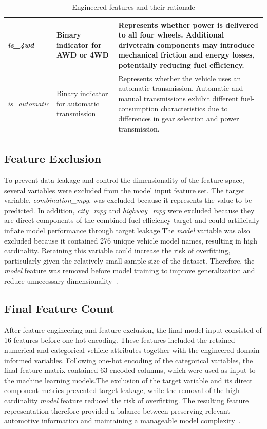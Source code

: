 \begin{table}[H]
{\begin{tabular}{|p{6.0cm}|p{4.5cm}|p{8.5cm}|}
\textit{is\_4wd} &
Binary indicator for AWD or 4WD &
Represents whether power is delivered to all four wheels. Additional drivetrain components may introduce mechanical friction and energy losses, potentially reducing fuel efficiency. \\
\hline

\textit{is\_automatic} &
Binary indicator for automatic transmission &
Represents whether the vehicle uses an automatic transmission. Automatic and manual transmissions exhibit different fuel-consumption characteristics due to differences in gear selection and power transmission. \\
\hline

\end{tabular}%
}
\caption{Engineered features and their rationale}
\label{tab:engineered_features}
\end{table} 


\subsection{Feature Exclusion}

To prevent data leakage and control the dimensionality of the feature space, several variables were excluded from the model input feature set. The target variable, \textit{combination\_mpg}, was excluded because it represents the value to be predicted. In addition, \textit{city\_mpg} and \textit{highway\_mpg} were excluded because they are direct components of the combined fuel-efficiency target and could artificially inflate model performance through target leakage.The \textit{model} variable was also excluded because it contained 276 unique vehicle model names, resulting in high cardinality. Retaining this variable could increase the risk of overfitting, particularly given the relatively small sample size of the dataset. Therefore, the \textit{model} feature was removed before model training to improve generalization and reduce unnecessary dimensionality~\cite{atique2026explainable}.

\subsection{Final Feature Count}

After feature engineering and feature exclusion, the final model input consisted of 16 features before one-hot encoding. These features included the retained numerical and categorical vehicle attributes together with the engineered domain-informed variables. Following one-hot encoding of the categorical variables, the final feature matrix contained 63 encoded columns, which were used as input to the machine learning models.The exclusion of the target variable and its direct component metrics prevented target leakage, while the removal of the high-cardinality \textit{model} feature reduced the risk of overfitting. The resulting feature representation therefore provided a balance between preserving relevant automotive information and maintaining a manageable model complexity~\cite{atique2026explainable}.


